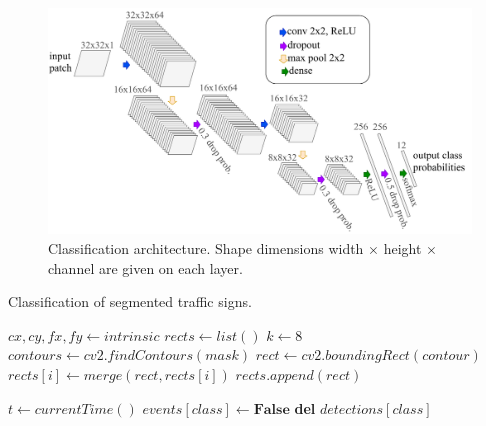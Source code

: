 \begin{figure}[h]
  \centering
  \includegraphics[width=.9\textwidth]{figures/classification-architecture.pdf}
  \caption[Classification architecture]{Classification architecture. Shape
    dimensions width $\times$ height $\times$ channel
    are given on each layer.}
  \label{figure:classification-architecture}
\end{figure}

\begin{algorithm}[h]
  \caption{Classification of segmented traffic signs.}
  \label{algorithm:classification}
  \begin{algorithmic}[1]
    \State $cx, cy, fx, fy \gets intrinsic$
    \State $rects \gets list()$
    \State $k \gets 8$
    \State $contours \gets cv2.findContours(mask)$
      \State $rect \gets cv2.boundingRect(contour)$
        \State $rects[i] \gets merge(rect, rects[i])$
      \EndIf
      \State $rects.append(rect)$
    \EndFor

    \State $t \gets currentTime()$
      \State $events[class] \gets \textbf{False}$
        \State \textbf{del} $detections[class]$
      \EndIf
    \EndFor
  \end{algorithmic}
\end{algorithm}

